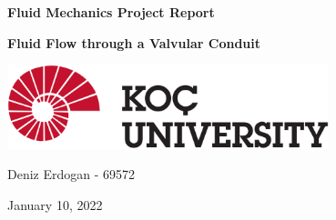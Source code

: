 \begin{titlepage}
	\begin{center}
		\vspace*{1cm}
        \hline
        \vspace{0.4cm}
		\textbf{\Huge Fluid Mechanics Project Report}
		\vspace{0.4cm}
		\hline

		\vspace{2cm}
		\textbf{\huge{Fluid Flow through a Valvular Conduit }}

		\vspace{5cm}
		
		
        \includegraphics[width=0.7\textwidth]{images/koclogo.png}
        
        
        \vfill
        
		\Large{Deniz Erdogan - 69572}

        January 10, 2022	

		\vspace{0.8cm}


	\end{center}
\end{titlepage}